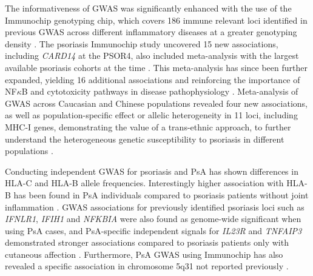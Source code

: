 The informativeness of GWAS was significantly enhanced with the use of the Immunochip genotyping chip, which covers 186 immune relevant loci identified in previous GWAS across different inflammatory diseases at a greater genotyping density \parencite{Tsoi2012}. The psoriasis Immunochip study uncovered 15 new associations, including \textit{CARD14} at the PSOR4, also included meta-analysis with the largest available psoriasis cohorts at the time \parencite{Tsoi2012}. This meta-analysis has since been further expanded, yielding 16 additional associations and reinforcing the importance of NF$\kappa$B and cytotoxicity pathways in disease pathophysiology \parencite{Tsoi2015a,Tsoi2017}. Meta-analysis of GWAS across Caucasian and Chinese populations revealed four new associations, as well as population-specific effect or allelic heterogeneity in 11 loci, including MHC-I genes, demonstrating the value of a trans-ethnic approach, to further understand the heterogeneous genetic susceptibility to psoriasis in different populations \parencite{Yin2015}. 

Conducting independent GWAS for psoriasis and PsA has shown differences in HLA-C and HLA-B allele frequencies. Interestingly higher association with HLA-B has been found in PsA individuals compared to psoriasis patients without joint inflammation \parencite{Winchester2012, Okada2014}. GWAS associations for previously identified psoriasis loci such as \textit{IFNLR1}, \textit{IFIH1} and \textit{NFKBIA} were also found as genome-wide significant when using PsA cases, and PsA-specific independent signals for \textit{IL23R} and \textit{TNFAIP3} demonstrated stronger associations compared to psoriasis patients only with cutaneous affection \parencite{Ellinghaus2010, Stuart2015}.  %
 Furthermore, PsA GWAS using Immunochip has also revealed a specific association in chromosome 5q31 not reported previously \parencite{Bowes2015}. 

